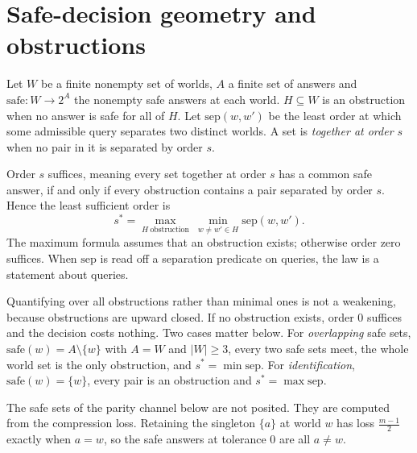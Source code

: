 \section{Safe-decision geometry and obstructions}
\label{sec:geometry}

Let $W$ be a finite nonempty set of worlds, $A$ a finite set of answers and
$\mathrm{safe}:W\to 2^{A}$ the nonempty safe answers at each world. $H\subseteq W$ is an obstruction when no answer is
safe for all of $H$. Let $\mathrm{sep}(w,w')$ be the least order at which some admissible query
separates two distinct worlds. A set is \emph{together at order $s$} when no pair in it is
separated by order $s$.

\begin{theorem}
\label{thm:safelaw}
Order $s$ suffices, meaning every set together at order $s$ has a common safe answer, if and
only if every obstruction contains a pair separated by order $s$. Hence the least sufficient
order is
\[
s^{*}=\max_{H\ \text{obstruction}}\ \min_{w\ne w'\in H}\mathrm{sep}(w,w').
\]
The maximum formula assumes that an obstruction exists; otherwise order zero suffices.
When $\mathrm{sep}$ is read off a separation predicate on queries, the law is a statement about
queries.
\end{theorem}


Quantifying over all obstructions rather than minimal ones is not a weakening, because
obstructions are upward closed. If no obstruction exists, order $0$ suffices and the decision
costs nothing. Two cases matter below. For \emph{overlapping} safe sets,
$\mathrm{safe}(w)=A\setminus\{w\}$ with $A=W$ and $|W|\ge3$, every two safe sets meet, the whole world set is
the only obstruction, and $s^{*}=\min\mathrm{sep}$. For \emph{identification},
$\mathrm{safe}(w)=\{w\}$, every pair is an obstruction and $s^{*}=\max\mathrm{sep}$.


The safe sets of the parity channel below are not posited. They are computed from the
compression loss. Retaining the singleton $\{a\}$ at world $w$ has loss $\frac{m-1}{2}$ exactly
when $a=w$, so the safe answers at tolerance $0$ are all $a\ne w$.

